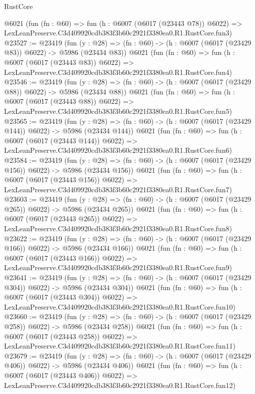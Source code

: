 \begin{lexlean}{RustCore}
\begin{coremodule}
    @6021
    (fun (fn : @60) =>
    fun (h : @6007 (@6017 (@23443 @78)) @6022) =>
    LexLeanPreserve.C3d409920cdb383f3b60c2921f3380ea0.R1.RustCore.fun3)
@23527 := @23419
    (fun (y : @28) => (fn : @60) -> (h : @6007 (@6017 (@23429 @83)) @6022) -> @5986 (@23434 @83))
    @6021
    (fun (fn : @60) =>
    fun (h : @6007 (@6017 (@23443 @83)) @6022) =>
    LexLeanPreserve.C3d409920cdb383f3b60c2921f3380ea0.R1.RustCore.fun4)
@23546 := @23419
    (fun (y : @28) => (fn : @60) -> (h : @6007 (@6017 (@23429 @88)) @6022) -> @5986 (@23434 @88))
    @6021
    (fun (fn : @60) =>
    fun (h : @6007 (@6017 (@23443 @88)) @6022) =>
    LexLeanPreserve.C3d409920cdb383f3b60c2921f3380ea0.R1.RustCore.fun5)
@23565 := @23419
    (fun (y : @28) => (fn : @60) -> (h : @6007 (@6017 (@23429 @144)) @6022) -> @5986 (@23434 @144))
    @6021
    (fun (fn : @60) =>
    fun (h : @6007 (@6017 (@23443 @144)) @6022) =>
    LexLeanPreserve.C3d409920cdb383f3b60c2921f3380ea0.R1.RustCore.fun6)
@23584 := @23419
    (fun (y : @28) => (fn : @60) -> (h : @6007 (@6017 (@23429 @156)) @6022) -> @5986 (@23434 @156))
    @6021
    (fun (fn : @60) =>
    fun (h : @6007 (@6017 (@23443 @156)) @6022) =>
    LexLeanPreserve.C3d409920cdb383f3b60c2921f3380ea0.R1.RustCore.fun7)
@23603 := @23419
    (fun (y : @28) => (fn : @60) -> (h : @6007 (@6017 (@23429 @265)) @6022) -> @5986 (@23434 @265))
    @6021
    (fun (fn : @60) =>
    fun (h : @6007 (@6017 (@23443 @265)) @6022) =>
    LexLeanPreserve.C3d409920cdb383f3b60c2921f3380ea0.R1.RustCore.fun8)
@23622 := @23419
    (fun (y : @28) => (fn : @60) -> (h : @6007 (@6017 (@23429 @166)) @6022) -> @5986 (@23434 @166))
    @6021
    (fun (fn : @60) =>
    fun (h : @6007 (@6017 (@23443 @166)) @6022) =>
    LexLeanPreserve.C3d409920cdb383f3b60c2921f3380ea0.R1.RustCore.fun9)
@23641 := @23419
    (fun (y : @28) => (fn : @60) -> (h : @6007 (@6017 (@23429 @304)) @6022) -> @5986 (@23434 @304))
    @6021
    (fun (fn : @60) =>
    fun (h : @6007 (@6017 (@23443 @304)) @6022) =>
    LexLeanPreserve.C3d409920cdb383f3b60c2921f3380ea0.R1.RustCore.fun10)
@23660 := @23419
    (fun (y : @28) => (fn : @60) -> (h : @6007 (@6017 (@23429 @258)) @6022) -> @5986 (@23434 @258))
    @6021
    (fun (fn : @60) =>
    fun (h : @6007 (@6017 (@23443 @258)) @6022) =>
    LexLeanPreserve.C3d409920cdb383f3b60c2921f3380ea0.R1.RustCore.fun11)
@23679 := @23419
    (fun (y : @28) => (fn : @60) -> (h : @6007 (@6017 (@23429 @406)) @6022) -> @5986 (@23434 @406))
    @6021
    (fun (fn : @60) =>
    fun (h : @6007 (@6017 (@23443 @406)) @6022) =>
    LexLeanPreserve.C3d409920cdb383f3b60c2921f3380ea0.R1.RustCore.fun12)

\end{coremodule}
\end{lexlean}
